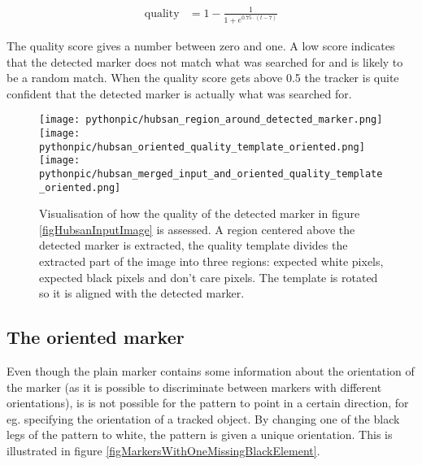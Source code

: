 \documentclass{article}
\begin{document}
\begin{align}
\text{quality} &= 1 - \frac{1}{1 + e^{0.75 \cdot (t - 7)}}
\end{align}

The quality score gives a number between zero and one.
A low score indicates that the detected marker does not match what was searched for and is likely to be a random match.
When the quality score gets above 0.5 the tracker is quite confident that the detected marker is actually what was searched for.

\begin{figure}
\texttt{[image: pythonpic/hubsan\_region\_around\_detected\_marker.png]}
\hfill
\texttt{[image: pythonpic/hubsan\_oriented\_quality\_template\_oriented.png]}
\hfill
\texttt{[image: pythonpic/hubsan\_merged\_input\_and\_oriented\_quality\_template\_oriented.png]}
\caption{Visualisation of how the quality of the detected marker in figure \ref{figHubsanInputImage} is assessed.
A region centered above the detected marker is extracted, the quality template divides the extracted part
of the image into three regions: expected white pixels, expected black pixels and don't care pixels.
The template is rotated so it is aligned with the detected marker.}
\label{figQualityEstimationProcess}
\end{figure}

\subsection{The oriented marker}
Even though the plain marker contains some information about the orientation of the
marker (as it is possible to discriminate between markers with different orientations),
is is not possible for the pattern to point in a certain direction, for eg. specifying the orientation of a tracked object.
By changing one of the black legs of the pattern to white, the pattern is given
a unique orientation.
This is illustrated in figure \ref{figMarkersWithOneMissingBlackElement}.
\end{document}
